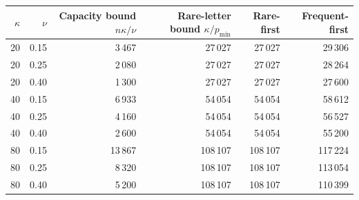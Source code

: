 \begin{tabular}{rrrrrr}
\toprule
$\kappa$ & $\nu$ & Capacity bound $n\kappa/\nu$ & Rare-letter bound $\kappa/p_{\min}$ & Rare-first & Frequent-first\\
\midrule
20 & 0.15 & 3\,467 & 27\,027 & 27\,027 & 29\,306\\
20 & 0.25 & 2\,080 & 27\,027 & 27\,027 & 28\,264\\
20 & 0.40 & 1\,300 & 27\,027 & 27\,027 & 27\,600\\
40 & 0.15 & 6\,933 & 54\,054 & 54\,054 & 58\,612\\
40 & 0.25 & 4\,160 & 54\,054 & 54\,054 & 56\,527\\
40 & 0.40 & 2\,600 & 54\,054 & 54\,054 & 55\,200\\
80 & 0.15 & 13\,867 & 108\,107 & 108\,107 & 117\,224\\
80 & 0.25 & 8\,320 & 108\,107 & 108\,107 & 113\,054\\
80 & 0.40 & 5\,200 & 108\,107 & 108\,107 & 110\,399\\
\bottomrule
\end{tabular}
